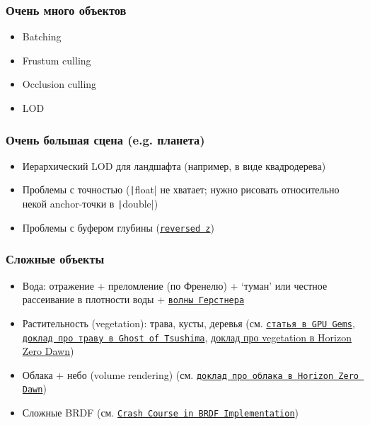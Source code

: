 \documentclass{beamer}
\begin{document}
\begin{frame}[fragile]
\frametitle{Очень много объектов}
\begin{itemize}
\item Batching
\item Frustum culling
\item Occlusion culling
\item LOD
\end{itemize}
\end{frame}

\begin{frame}[fragile]
\frametitle{Очень большая сцена (e.g. планета)}
\begin{itemize}
\item Иерархический LOD для ландшафта (например, в виде квадродерева)
\item Проблемы с точностью (\texttt|float| не хватает; нужно рисовать относительно некой anchor-точки в \texttt|double|)
\item Проблемы с буфером глубины (\href{https://nlguillemot.wordpress.com/2016/12/07/reversed-z-in-opengl/}{\texttt{reversed z}})
\end{itemize}
\end{frame}

\begin{frame}[fragile]
\frametitle{Сложные объекты}
\begin{itemize}
\item Вода: отражение + преломление (по Френелю) + `туман' или честное рассеивание в плотности воды + \href{https://en.wikipedia.org/wiki/Trochoidal_wave}{\texttt{волны Герстнера}}
\item Растительность (vegetation): трава, кусты, деревья (см. \href{https://developer.nvidia.com/gpugems/gpugems/part-i-natural-effects/chapter-7-rendering-countless-blades-waving-grass}{\texttt{статья в GPU Gems}}, \href{https://www.youtube.com/watch?v=Ibe1JBF5i5Y}{\texttt{доклад про траву в Ghost of Tsushima}}, \href{https://www.youtube.com/watch?app=desktop&v=wavnKZNSYqU}{доклад про vegetation в Horizon Zero Dawn})
\item Облака + небо (volume rendering) (см. \href{https://www.guerrilla-games.com/read/the-real-time-volumetric-cloudscapes-of-horizon-zero-dawn}{\texttt{доклад про облака в Horizon Zero Dawn}})
\item Сложные BRDF (см. \href{https://boksajak.github.io/files/CrashCourseBRDF.pdf}{\texttt{Crash Course in BRDF Implementation}})
\end{itemize}
\end{frame}
\end{document}
